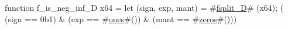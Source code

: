 function f_is_neg_inf_D   x64 = {
  let (sign, exp, mant) = #\hyperref[sailRISCVzfsplitzyD]{fsplit\_D}# (x64);
  (  (sign == 0b1)
   & (exp  == #\hyperref[sailRISCVzones]{ones}#())
   & (mant == #\hyperref[sailRISCVzzzeros]{zeros}#()))
}
